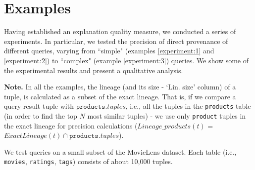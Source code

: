 \section{Examples}\label{sec:initial-experimentation}

Having established an explanation quality measure, we conducted a series of experiments. In particular, we tested the precision of direct provenance of different queries, varying from ``simple" (examples \ref{experiment:1} and \ref{experiment:2}) to ``complex" (example \ref{experiment:3}) queries. We show some of the experimental results and present a qualitative analysis.
\par\textbf{Note.} In all the examples, the lineage (and its size - `Lin. size' column) of a tuple, is calculated as a subset of the exact lineage. That is, if we compare a query result tuple with $\texttt{products}.tuples$, i.e., all the tuples in the \texttt{products} table (in order to find the top $N$ most similar tuples) - we use only \texttt{product} tuples in the exact lineage for precision calculations ($Lineage\_products(t)$ = $ExactLineage(t) \cap \texttt{products}.tuples$).


\begin{runexample}
We test queries on a small subset of the MovieLens dataset. Each table (i.e., \texttt{movies}, \texttt{ratings}, \texttt{tags}) consists of about 10,000 tuples.
\end{runexample}

